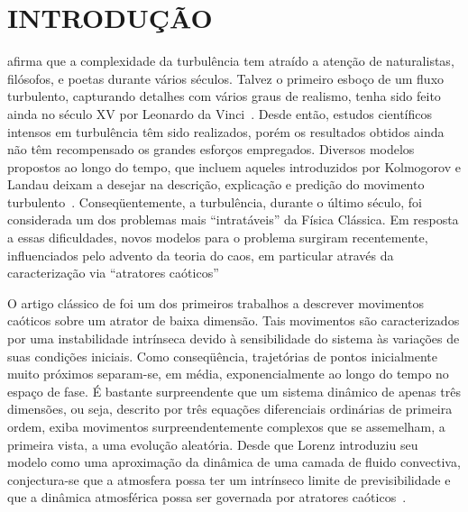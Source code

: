 
\chapter{INTRODUÇÃO}

 afirma que a complexidade da turbulência tem atraído \cite{Chelimsky2010, Chelimsky2010XX} a atenção de naturalistas, filósofos, e poetas durante vários séculos. Talvez o primeiro esboço de um fluxo turbulento, capturando detalhes com vários graus de realismo, tenha sido feito ainda no século XV por Leonardo da Vinci~\cite{sreenivasan/99}. Desde então, estudos científicos intensos em turbulência têm sido realizados, porém os resultados obtidos ainda não têm recompensado os grandes esforços empregados. Diversos modelos propostos ao longo do tempo, que incluem aqueles introduzidos por Kolmogorov e Landau deixam a desejar na descrição, explicação e predição do movimento turbulento~\cite{ruelle/91}. Conseqüentemente, a turbulência, durante o último século, foi considerada um dos problemas mais ``intratáveis'' da Física Clássica. Em resposta a essas dificuldades, novos modelos para o problema surgiram recentemente, influenciados pelo advento da teoria do caos, em particular através da caracterização via ``atratores caóticos''~\cite{ruelltak/71} 

O artigo clássico de  foi um dos primeiros trabalhos a descrever movimentos caóticos sobre um atrator de baixa dimensão. Tais movimentos são caracterizados por uma instabilidade intrínseca devido à sensibilidade do sistema às variações de suas condições iniciais. Como conseqüência, trajetórias de pontos inicialmente muito próximos separam-se, em média, exponencialmente ao longo do tempo no espaço de fase. É bastante surpreendente que um sistema dinâmico de apenas três dimensões, ou seja, descrito por três equações diferenciais ordinárias de primeira ordem, exiba movimentos surpreendentemente complexos que se assemelham, a primeira vista, a uma evolução aleatória. Desde que Lorenz introduziu seu modelo como uma aproximação da dinâmica de uma camada de fluido convectiva, conjectura-se que a atmosfera possa ter um intrínseco limite de previsibilidade e que a dinâmica atmosférica possa ser governada por atratores caóticos~\cite{weber/95}. 

